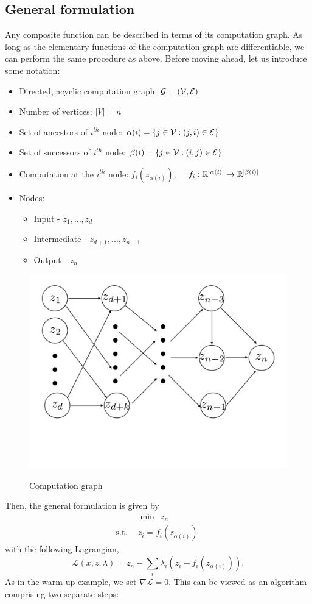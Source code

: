 \subsection{General formulation}
Any composite function can be described in terms of its computation graph. As
long as the elementary functions of the computation graph are differentiable, we can perform the same procedure as above. Before moving ahead, let us introduce some notation: 
\begin{itemize}
\item Directed, acyclic computation graph: $\mathcal{G} = ({\cal V}, {\cal E})$
\item Number of vertices: $|V| = n$
\item Set of ancestors of $i^{th}$ node: $\alpha(i) = \{ j \in {\cal V}: (j, i) \in {\cal E}\}$
\item Set of successors of $i^{th}$ node: $\beta(i) = \{ j\in {\cal V}: (i, j) \in {\cal E}\}$
\item Computation at the $i^{th}$ node: $f_i(z_{\alpha(i)})$, $\quad f_i: \mathbb{R}^{|\alpha(i)|} \rightarrow \mathbb{R}^{|\beta(i)|}$
\item Nodes:
\begin{itemize}
\item Input - $z_1,\dots,z_ d$
\item Intermediate - $z_{d+1}, \dots, z_{n-1}$
\item Output - $z_n$
\end{itemize}
\end{itemize}

\begin{figure}
 \centering
\includegraphics[width=0.7\linewidth, height=0.4\linewidth]{figures/lecture16_computation_graph.pdf} 
\label{fig:subim1}
\caption{Computation graph}
\end{figure}
\noindent
Then, the general formulation is given by
\begin{align}
&\min \ \ z_n \\
\text{s.t.} \ \ &z_i = f_i(z_{\alpha(i)}). \nonumber
\end{align}
with the following Lagrangian,
\begin{equation}
\mathcal{L}(x, z, \lambda) = z_n - \sum_{i} \lambda_i (z_i - f_i(z_{\alpha(i)})).
\end{equation}
As in the warm-up example, we set $\nabla \mathcal{L} = 0$. This can be viewed as an algorithm comprising two separate steps:
